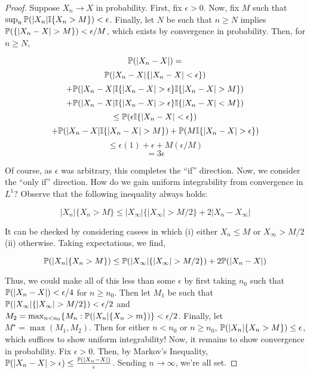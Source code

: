     \begin{proof}
        Suppose $X_n \to X$ in probability. First, fix $\epsilon > 0$. Now, 
        fix $M$ such that $\sup_n \mathbb P(|X_n|\mathbb I\{X_n > M\}) < \epsilon$. 
        Finally, let $N$ be such that $n \geq N$ implies $\mathbb P(\{|X_n - X| > M\}) < \epsilon/M$, which exists 
        by convergence in probability. Then, for $n \geq N$,
        
        \[ \mathbb P(|X_n - X|) = \] 
        \[ \mathbb P(|X_n - X|\{|X_n - X| < \epsilon\}) \]
        \[ + \mathbb P(|X_n - X| \mathbb I\{|X_n - X| > \epsilon \}\mathbb I\{|X_n - X| > M\})  \] 
        \[ + \mathbb P(|X_n - X| \mathbb I\{|X_n - X| > \epsilon \}\mathbb I\{|X_n - X| < M\}) \]
        \[ \leq \mathbb P(\epsilon \mathbb I\{|X_n - X| < \epsilon\}) \] 
        \[ + \mathbb P(|X_n - X|\mathbb I\{|X_n - X| > M\}) + \mathbb P(M\mathbb I\{|X_n - X| > \epsilon\}) \]
        \[ \leq \epsilon(1) + \epsilon + M(\epsilon/M) \] 
        \[ = 3\epsilon \]

        Of course, as $\epsilon$ was arbitrary, this completes the ``if'' direction. Now, 
        we consider the ``only if'' direction. How do we gain uniform integrability from convergence in 
        $L^1$? Observe that the following inequality always holds:

        \[ |X_n|\{X_n > M\} \leq |X_\infty|\{|X_\infty| > M/2\} + 2 |X_n - X_\infty| \]

        It can be checked by considering casees in which (i) either $X_n \leq M$ 
        or $X_\infty > M/2$ (ii) otherwise. Taking expectations, we find, 

        \[ \mathbb P(|X_n|\{X_n > M\}) \leq \mathbb P(|X_\infty|\{|X_\infty| > M/2\}) + 2\mathbb P(|X_n-X|) \]

        Thus, we could make all of this less than some $\epsilon$ by first taking 
        $n_0$ such that $\mathbb P(|X_n-X|) < \epsilon/4$ for $n \geq n_0$. Then let 
        $M_1$ be such that $\mathbb P(|X_\infty|\{|X_\infty| > M/2\}) < \epsilon/2$ and 
        $M_2 = \max_{n < n_0} \{M_n : \mathbb P(|X_n|\{X_n > m\})\} < \epsilon/2$. Finally, let 
        $M^\star = \max(M_1,M_2)$. Then for either 
        $n < n_0$ or $n \geq n_0$, $\mathbb P(|X_n|\{X_n > M\}) \leq \epsilon$, which suffices to show 
        uniform integrability! Now, it remains to show convergence in probability. Fix $\epsilon > 0$. 
        Then, by Markov's Inequality, $\mathbb P(|X_n - X| > \epsilon) \leq \frac{\mathbb P(|X_n - X|)}{\epsilon}$. 
        Sending $n \to \infty$, we're all set. 

    \end{proof}


